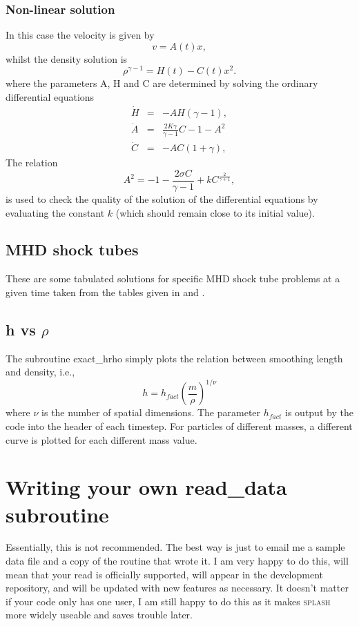 \documentclass[a4paper,10pt]{article}
\newcommand{\splash}{\textsc{splash }}
\begin{document}
\subsubsection{ Non-linear solution}
In this case the velocity is given by
\begin{equation}
v = A(t) x,
\end{equation}
whilst the density solution is
\begin{equation}
\rho^{\gamma -1} = H(t) - C(t) x^2.
\end{equation}
where the parameters A, H and C are determined by solving the ordinary
differential equations
\begin{eqnarray}
\dot{H} & = & -AH(\gamma -1), \\
\dot{A} & = & \frac{2K \gamma}{\gamma -1} C - 1 - A^2 \\
\dot{C} & = & -AC(1+ \gamma),
\end{eqnarray}
The relation
\begin{equation}
A^2 = -1 - \frac{2 \sigma C}{\gamma -1} + kC^{\frac{2}{\gamma +1}},
\label{eq:kconst}
\end{equation}
is used to check the quality of the solution of the differential equations by
evaluating the constant $k$ (which should remain close to its initial value).

\subsection{MHD shock tubes}
 These are some tabulated solutions for specific MHD shock tube problems at a
given time taken from the tables given in \citet{dw94} and \citet{rj95}.

\subsection{h vs $\rho$}
 The subroutine exact\_hrho simply plots the relation between smoothing length
and density, i.e.,
\begin{equation}
h = h_{fact} \left(\frac{m}{\rho}\right)^{1/\nu}
\end{equation}
where $\nu$ is the number of spatial dimensions. The parameter $h_{fact}$ is
output by the code into the header of each timestep. For particles of different
masses, a different curve is plotted for each different mass value.

\newpage

\section{Writing your own read\_data subroutine}%
\label{sec:writeyourown}
Essentially, this is not recommended. The best way is just to email me a sample data file and a copy of the routine that wrote it. I am very happy to do this, will mean that your read is officially supported, will appear in the development repository, and will be updated with new features as necessary. It doesn't matter if your code only has one user, I am still happy to do this as it makes \splash more widely useable and saves trouble later.
\end{document}
